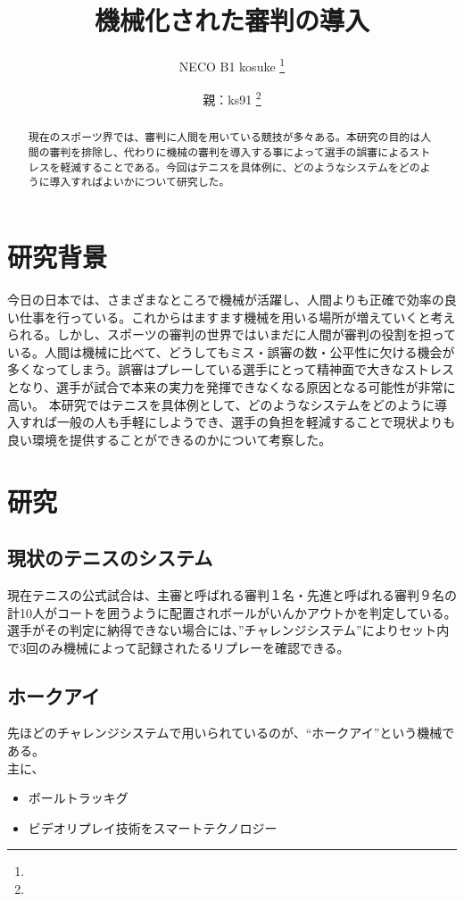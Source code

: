 \documentclass[a4j,10pt]{jsarticle}
\begin{document}

\title{機械化された審判の導入}

\author{
    NECO B1 kosuke \thanks{}
    \and
    親：ks91 \thanks{}
}

\begin{abstract}
現在のスポーツ界では、審判に人間を用いている競技が多々ある。本研究の目的は人間の審判を排除し、代わりに機械の審判を導入する事によって選手の誤審によるストレスを軽減することである。今回はテニスを具体例に、どのようなシステムをどのように導入すればよいかについて研究した。
\end{abstract}

\maketitle
\thispagestyle{empty}

\section{研究背景}

今日の日本では、さまざまなところで機械が活躍し、人間よりも正確で効率の良い仕事を行っている。これからはますます機械を用いる場所が増えていくと考えられる。しかし、スポーツの審判の世界ではいまだに人間が審判の役割を担っている。人間は機械に比べて、どうしてもミス・誤審の数・公平性に欠ける機会が多くなってしまう。誤審はプレーしている選手にとって精神面で大きなストレスとなり、選手が試合で本来の実力を発揮できなくなる原因となる可能性が非常に高い。
本研究ではテニスを具体例として、どのようなシステムをどのように導入すれば一般の人も手軽にしようでき、選手の負担を軽減することで現状よりも良い環境を提供することができるのかについて考察した。


\section{研究}

\subsection{現状のテニスのシステム}
現在テニスの公式試合は、主審と呼ばれる審判１名・先進と呼ばれる審判９名の計10人がコートを囲うように配置されボールがいんかアウトかを判定している。選手がその判定に納得できない場合には、”チャレンジシステム”によりセット内で3回のみ機械によって記録されたるリプレーを確認できる。



\subsection{ホークアイ}
先ほどのチャレンジシステムで用いられているのが、“ホークアイ”という機械である。
\\ 主に、
\begin{itemize}
\item ボールトラッキグ
\item ビデオリプレイ技術をスマートテクノロジー
\end{itemize}
\end{document}

